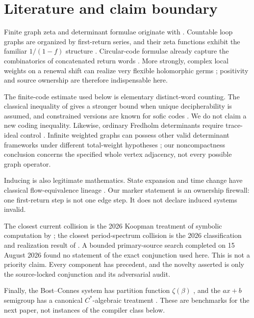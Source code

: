 \section{Literature and claim boundary}

Finite graph zeta and determinant formulae originate with
\citet{BowenLanford1970}.  Countable loop graphs are organized by first-return
series, and their zeta functions exhibit the familiar $1/(1-f)$ structure
\citep{BoyleBuzziGomez2006,Hong2011}.  Circular-code formulae already capture
the combinatorics of concatenated return words \citep{Keller1991}.  More
strongly, complex local weights on a renewal shift can realize very flexible
holomorphic germs \citep{Sarig2004}; positivity and source ownership are
therefore indispensable here.

The finite-code estimate used below is elementary distinct-word counting.
The classical inequality of \citet{McMillan1956} gives a stronger bound when
unique decipherability is assumed, and constrained versions are known for
sofic codes \citep{BealPerrin2005}.  We do not claim a new coding inequality.
Likewise, ordinary Fredholm determinants require
trace-ideal control \citep{Simon2005}.  Infinite weighted graphs can possess
other valid determinant frameworks under different total-weight hypotheses
\citep{Deitmar2015}; our noncompactness conclusion concerns the specified
whole vertex adjacency, not every possible graph operator.

Inducing is also legitimate mathematics.  State expansion and time change
have classical flow-equivalence lineage \citep{ParrySullivan1975}.  Our
marker statement is an ownership firewall: one first-return step is not one
edge step.  It does not declare induced systems invalid.

The closest current collision is the 2026 Koopman treatment of symbolic
computation by \citet{CaravelliDelvenne2026}; the closest period-spectrum
collision is the 2026 classification and realization result of
\citet{deJong2026}.  A bounded primary-source search completed on 15 August
2026 found no statement of the exact conjunction used here.  This is not a
priority claim.  Every component has precedent, and the novelty asserted is
only the source-locked conjunction and its adversarial audit.

Finally, the Bost--Connes system has partition function $\zeta(\beta)$
\citep{BostConnes1995}, and the $ax+b$ semigroup has a canonical
$C^*$-algebraic treatment \citep{Cuntz2008}.  These are benchmarks for the
next paper, not instances of the compiler class below.

